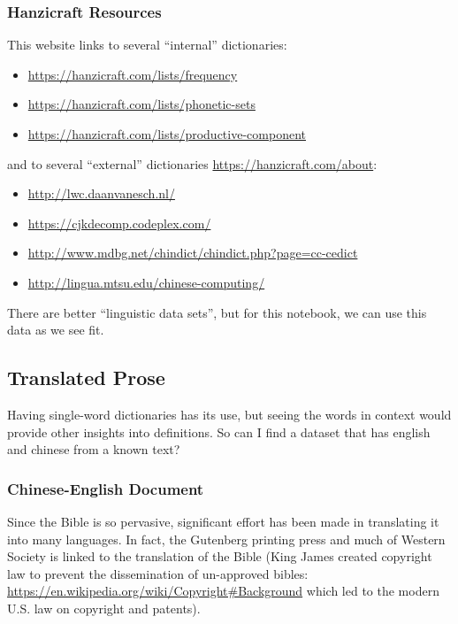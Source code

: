\documentclass[
]{article}
\providecommand{\tightlist}{%
  \setlength{\itemsep}{0pt}\setlength{\parskip}{0pt}}
\begin{document}
\hypertarget{hanzicraft-resources}{%
\subsubsection{Hanzicraft Resources}\label{hanzicraft-resources}}

This website links to several ``internal'' dictionaries:

\begin{itemize}
\tightlist
\item
  \url{https://hanzicraft.com/lists/frequency}
\item
  \url{https://hanzicraft.com/lists/phonetic-sets}
\item
  \url{https://hanzicraft.com/lists/productive-component}
\end{itemize}

and to several ``external'' dictionaries
\url{https://hanzicraft.com/about}:

\begin{itemize}
\tightlist
\item
  \url{http://lwc.daanvanesch.nl/}
\item
  \url{https://cjkdecomp.codeplex.com/}
\item
  \url{http://www.mdbg.net/chindict/chindict.php?page=cc-cedict}
\item
  \url{http://lingua.mtsu.edu/chinese-computing/}
\end{itemize}

There are better ``linguistic data sets'', but for this notebook, we can
use this data as we see fit.

\hypertarget{translated-prose}{%
\subsection{Translated Prose}\label{translated-prose}}

Having single-word dictionaries has its use, but seeing the words in
context would provide other insights into definitions. So can I find a
dataset that has english and chinese from a known text?

\hypertarget{chinese-english-document}{%
\subsubsection{Chinese-English
Document}\label{chinese-english-document}}

Since the Bible is so pervasive, significant effort has been made in
translating it into many languages. In fact, the Gutenberg printing
press and much of Western Society is linked to the translation of the
Bible (King James created copyright law to prevent the dissemination of
un-approved bibles:
\url{https://en.wikipedia.org/wiki/Copyright\#Background} which led to
the modern U.S. law on copyright and patents).
\end{document}
